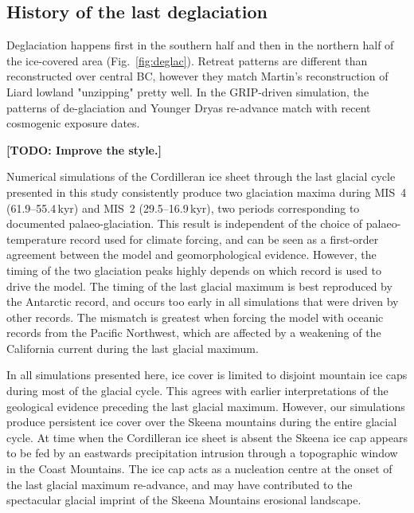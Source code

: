 \documentclass[tc, ms]{copernicus}
\newcommand{\todo}[1]{\textbf{[TODO: #1]}}
\begin{document}
\subsection{History of the last deglaciation}

Deglaciation happens first in the southern half and then in the northern half
of the ice-covered area (Fig.~\ref{fig:deglac}). Retreat patterns are different
than reconstructed over central BC, however they match Martin's reconstruction
of Liard lowland "unzipping" pretty well. In the GRIP-driven simulation, the
patterns of de-glaciation and Younger Dryas re-advance match with recent
cosmogenic exposure dates.

\conclusions
\label{sec:concl}

\todo{Improve the style.}

Numerical simulations of the Cordilleran ice sheet through the last glacial
cycle presented in this study consistently produce two glaciation maxima during
MIS~4 (61.9--55.4\,\unit{kyr}) and MIS~2 (29.5--16.9\,\unit{kyr}), two periods
corresponding to documented palaeo-glaciation. This result is independent
of the choice of palaeo-temperature record used for climate forcing, and
can be seen as a first-order agreement between the model and geomorphological
evidence. However, the timing of the two glaciation peaks highly depends on
which record
is used to drive the model. The timing of the last glacial maximum is best
reproduced by the Antarctic record, and occurs too early in all simulations
that were driven by other records. The mismatch is greatest when forcing the
model with oceanic records from the Pacific Northwest, which are affected by a
weakening of the California current during the last glacial maximum.

In all simulations presented here, ice cover is limited to disjoint mountain ice
caps during most of the glacial cycle. This agrees with earlier interpretations
of the geological evidence preceding the last glacial maximum. However, our
simulations produce persistent ice cover over the Skeena mountains during
the entire glacial cycle. At time when the Cordilleran ice sheet is absent
the Skeena ice cap appears to be fed by an eastwards precipitation
intrusion through a topographic window in the Coast Mountains. The ice cap acts
as a nucleation centre at the onset of the last glacial maximum re-advance, and
may have contributed to the spectacular glacial imprint of the Skeena Mountains
erosional landscape.
\end{document}
